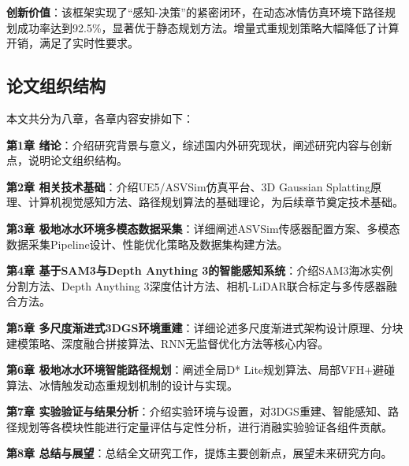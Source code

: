 \documentclass[12pt,a4paper]{ctexbook}
\begin{document}
\textbf{创新价值}：该框架实现了``感知-决策''的紧密闭环，在动态冰情仿真环境下路径规划成功率达到92.5\%，显著优于静态规划方法。增量式重规划策略大幅降低了计算开销，满足了实时性要求。

\subsection{论文组织结构}

本文共分为八章，各章内容安排如下：

\textbf{第1章 绪论}：介绍研究背景与意义，综述国内外研究现状，阐述研究内容与创新点，说明论文组织结构。

\textbf{第2章 相关技术基础}：介绍UE5/ASVSim仿真平台、3D Gaussian Splatting原理、计算机视觉感知方法、路径规划算法的基础理论，为后续章节奠定技术基础。

\textbf{第3章 极地冰水环境多模态数据采集}：详细阐述ASVSim传感器配置方案、多模态数据采集Pipeline设计、性能优化策略及数据集构建方法。

\textbf{第4章 基于SAM3与Depth Anything 3的智能感知系统}：介绍SAM3海冰实例分割方法、Depth Anything 3深度估计方法、相机-LiDAR联合标定与多传感器融合方法。

\textbf{第5章 多尺度渐进式3DGS环境重建}：详细论述多尺度渐进式架构设计原理、分块建模策略、深度融合拼接算法、RNN无监督优化方法等核心内容。

\textbf{第6章 极地冰水环境智能路径规划}：阐述全局D* Lite规划算法、局部VFH+避碰算法、冰情触发动态重规划机制的设计与实现。

\textbf{第7章 实验验证与结果分析}：介绍实验环境与设置，对3DGS重建、智能感知、路径规划等各模块性能进行定量评估与定性分析，进行消融实验验证各组件贡献。

\textbf{第8章 总结与展望}：总结全文研究工作，提炼主要创新点，展望未来研究方向。

\end{document}
